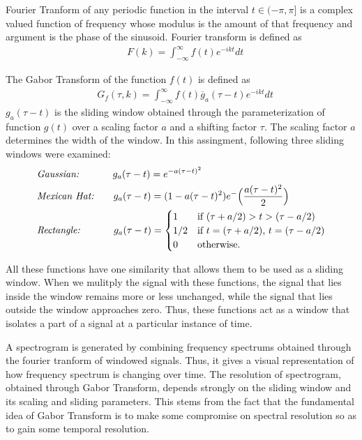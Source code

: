 \documentclass{article}
\begin{document}
Fourier Tranform of any periodic function in the interval $t \in (-\pi, \pi]$ is a complex valued function of frequency whose modulus is the amount of that frequency and argument is the phase of the sinusoid. Fourier transform is defined as
\begin{align*}
&F(k) = \int_{-\infty}^{\infty} f(t)e^{-ikt} dt 
\end{align*}

The Gabor Transform of the function $f(t)$ is defined as
\begin{align*}
&G_f(\tau, k) = \int_{-\infty}^{\infty} f(t)\overline{g}_a(\tau - t)e^{-ikt} dt 
\end{align*}
$g_a(\tau - t)$ is the sliding window obtained through the parameterization of function $g(t)$ over a scaling factor $a$ and a shifting factor $\tau$. The scaling factor $a$ determines the width of the window. In this assingment, following three sliding windows were examined:
\begin{align*}
&\textit{Gaussian: } \quad \quad \quad g_a(\tau - t) = e^{-a(\tau - t)^2} \\
&\textit{Mexican Hat:} \quad \quad g_a(\tau - t) = (1-a(\tau-t)^2)e^-{\Big(\frac{a(\tau-t)^2}{2}\Big)} \\
&\textit{Rectangle: } \quad \quad \quad
   g_a(\tau - t) = 
   \begin{cases}
     1 &\text{if $ (\tau + a/2) > t > (\tau - a/2)$} \\
     1/2 &\text{if $t = (\tau + a/2)$, $t = (\tau - a/2)$} \\
     0 &\text{otherwise}.
   \end{cases}
\end{align*}

All these functions have one similarity that allows them to be used as a sliding window. When we mulitply the signal with these functions, the signal that lies inside the window remains more or less unchanged, while the signal that lies outside the window approaches zero. Thus, these functions act as a window that isolates a part of a signal at a particular instance of time.

A spectrogram is generated by combining frequency spectrums obtained through the fourier tranform of windowed signals. Thus, it gives a visual representation of how frequency spectrum is changing over time. The resolution of spectrogram, obtained through Gabor Transform, depends strongly on the sliding window and its scaling and sliding parameters. This stems from the fact that the fundamental idea of Gabor Transform is to make some compromise on spectral resolution so as to gain some temporal resolution.
\end{document}
